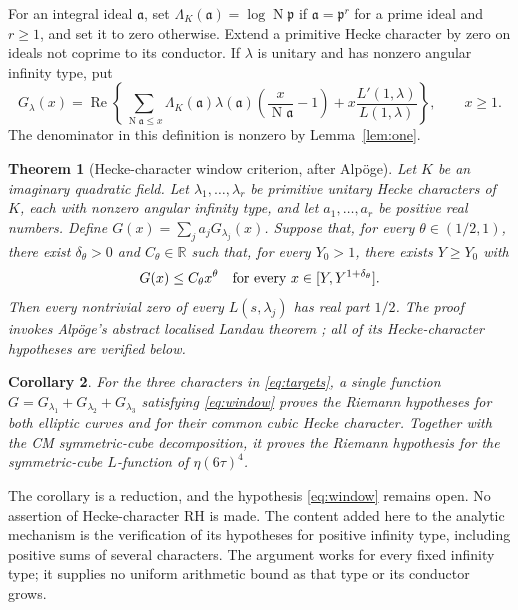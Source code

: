 \documentclass[11pt]{article}
\newcommand{\N}{\operatorname{N}}
\newcommand{\Rea}{\operatorname{Re}}
\newtheorem{theorem}{Theorem}[section]
\newtheorem{corollary}[theorem]{Corollary}
\theoremstyle{definition}
\theoremstyle{remark}
\begin{document}
For an integral ideal $\mathfrak a$, set
$\Lambda_K(\mathfrak a)=\log\N\mathfrak p$ if
$\mathfrak a=\mathfrak p^r$ for a prime ideal and $r\geq1$, and set it to
zero otherwise.  Extend a primitive Hecke character by zero on ideals not
coprime to its conductor.  If $\lambda$ is unitary and has nonzero angular
infinity type, put
\begin{equation}\label{eq:Gdef}
 G_\lambda(x)=\Rea\left\{
 \sum_{\N\mathfrak a\leq x}\Lambda_K(\mathfrak a)\lambda(\mathfrak a)
       \left(\frac{x}{\N\mathfrak a}-1\right)
       +x\frac{L'(1,\lambda)}{L(1,\lambda)}\right\},\qquad x\geq1.
\end{equation}
The denominator in this definition is nonzero by Lemma~\ref{lem:one}.

\begin{theorem}[Hecke-character window criterion, after Alp\"oge]
\label{thm:window}
Let $K$ be an imaginary quadratic field.  Let $\lambda_1,\ldots,\lambda_r$
be primitive unitary Hecke characters of $K$, each with nonzero angular
infinity type, and let $a_1,\ldots,a_r$ be positive real numbers.  Define
$G(x)=\sum_j a_jG_{\lambda_j}(x)$.
Suppose that, for every $\theta\in(1/2,1)$, there exist
$\delta_\theta>0$ and $C_\theta\in\mathbb R$ such that, for every
$Y_0>1$, there exists $Y\geq Y_0$ with
\begin{equation}\label{eq:window}
 G(x)\leq C_\theta x^\theta
 \quad\hbox{for every }x\in[Y,Y^{1+\delta_\theta}].
\end{equation}
Then every nontrivial zero of every $L(s,\lambda_j)$ has real part $1/2$.
The proof invokes Alp\"oge's abstract localised Landau theorem
\cite[\texttt{Deduction.landau\_window}]{AlpogeWindow}; all of its
Hecke-character hypotheses are verified below.
\end{theorem}

\begin{corollary}\label{cor:three}
For the three characters in \eqref{eq:targets}, a single function
$G=G_{\lambda_1}+G_{\lambda_2}+G_{\lambda_3}$ satisfying
\eqref{eq:window} proves the Riemann hypotheses for both elliptic curves
and for their common cubic Hecke character.  Together with the CM
symmetric-cube decomposition, it proves the Riemann hypothesis for the
symmetric-cube $L$-function of $\eta(6\tau)^4$.
\end{corollary}

The corollary is a reduction, and the hypothesis \eqref{eq:window} remains
open.  No assertion of Hecke-character RH is made.  The content added here
to the analytic mechanism is the verification of its hypotheses for
positive infinity type, including positive sums of several characters.
The argument works for every fixed infinity type; it supplies no uniform
arithmetic bound as that type or its conductor grows.
\end{document}
